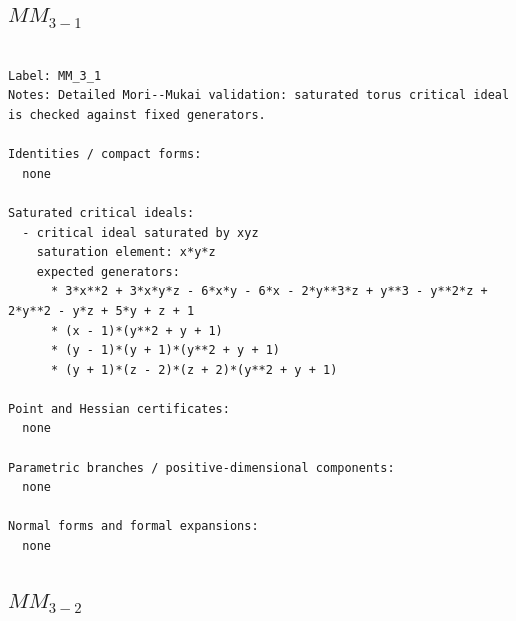 \documentclass[10pt,a4paper]{article}
\begin{document}
\subsection*{$ MM_{3-1} $}

\begin{lstlisting}

Label: MM_3_1
Notes: Detailed Mori--Mukai validation: saturated torus critical ideal is checked against fixed generators.

Identities / compact forms:
  none

Saturated critical ideals:
  - critical ideal saturated by xyz
    saturation element: x*y*z
    expected generators:
      * 3*x**2 + 3*x*y*z - 6*x*y - 6*x - 2*y**3*z + y**3 - y**2*z + 2*y**2 - y*z + 5*y + z + 1
      * (x - 1)*(y**2 + y + 1)
      * (y - 1)*(y + 1)*(y**2 + y + 1)
      * (y + 1)*(z - 2)*(z + 2)*(y**2 + y + 1)

Point and Hessian certificates:
  none

Parametric branches / positive-dimensional components:
  none

Normal forms and formal expansions:
  none

\end{lstlisting}

\subsection*{$ MM_{3-2} $}
\end{document}
